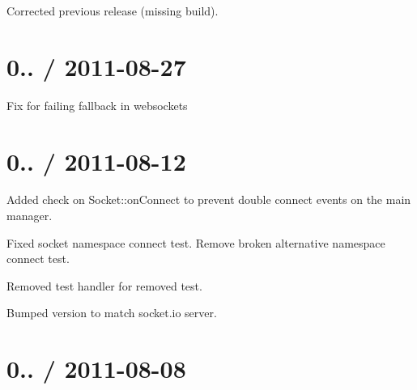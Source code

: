 \begin{DoxyItemize}
\item Corrected previous release (missing build).
\end{DoxyItemize}

\section*{0.. / 2011-\/08-\/27 }


\begin{DoxyItemize}
\item Fix for failing fallback in websockets
\end{DoxyItemize}

\section*{0.. / 2011-\/08-\/12 }


\begin{DoxyItemize}
\item Added check on {\ttfamily Socket\+::on\+Connect} to prevent double {\ttfamily connect} events on the main manager.
\item Fixed socket namespace connect test. Remove broken alternative namespace connect test.
\item Removed test handler for removed test.
\item Bumped version to match {\ttfamily socket.\+io} server.
\end{DoxyItemize}

\section*{0.. / 2011-\/08-\/08 }


